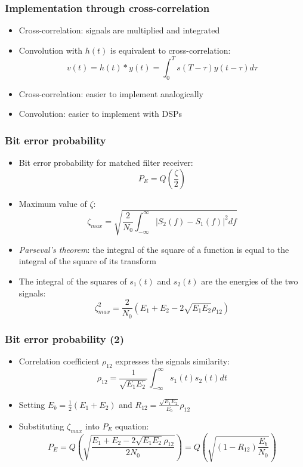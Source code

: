 \documentclass{beamer}
\begin{document}
\begin{frame}
	\frametitle{Implementation through cross-correlation}
	\begin{itemize}
		\item Cross-correlation: signals are multiplied and integrated
		\item Convolution with $h(t)$ is equivalent to cross-correlation:
		\begin{equation}
			v(t) = h(t) * y(t) = \int_0^T {s(T - \tau)y(t - \tau) d\tau}
		\end{equation}
		\item Cross-correlation: easier to implement analogically
		\item Convolution: easier to implement with DSPs
	\end{itemize}
\end{frame}

\begin{frame}
	\frametitle{Bit error probability}
	\begin{itemize}
		\item Bit error probability for matched filter receiver:
		\begin{equation}
			P_E = Q\left( \frac{\zeta}{2} \right)
		\end{equation}
		\item Maximum value of $\zeta$:
		\begin{equation}
			\zeta_{max} = \sqrt{\frac{2}{N_0} \int_{-\infty}^{\infty} {{|S_2(f) - S_1(f)|}^2} df}
		\end{equation}
		\item \emph{Parseval's theorem}: the integral of the square of a function is equal to the integral of the square of its transform
		\item The integral of the squares of $s_1(t)$ and $s_2(t)$ are the energies of the two signals:
		\begin{equation}
			\zeta_{max}^2 = \frac{2}{N_0} \left(E_1 + E_2 -2\sqrt{E_1 E_2}\rho_{12}\right)
		\end{equation}
	\end{itemize}
\end{frame}

\begin{frame}
	\frametitle{Bit error probability (2)}
	\begin{itemize}
		\item Correlation coefficient $\rho_{12}$ expresses the signals similarity:
		\begin{equation}
			\rho_{12} = \frac{1}{\sqrt{E_1 E_2}} \int_{-\infty}^{\infty} {s_1(t) s_2(t) dt}
		\end{equation}
		\item Setting $E_b = \frac{1}{2}(E_1 + E_2)$ and $R_{12} = \frac{\sqrt{E_1 E_2}}{E_b}\rho_{12}$
		\item Substituting $\zeta_{max}$ into $P_E$ equation:
		\begin{equation}
			P_E = Q\left( \sqrt{\frac{E_1 + E_2 - 2\sqrt{E_1 E_2} \rho_{12}}{2 N_0}} \right) = Q\left( \sqrt{(1 - R_{12}) \frac{E_b}{N_0}} \right)
		\end{equation}
	\end{itemize}
\end{frame}
\end{document}
